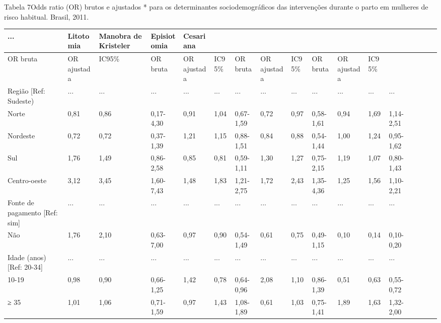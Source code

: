 \documentclass{article}
\begin{document}
Tabela 7Odds ratio (OR) brutos e ajustados * para os determinantes
sociodemográficos das intervenções durante o parto em mulheres de risco
habitual. Brasil, 2011.
\begin{table}
\begin{xtabular}{ l | l | l | l | l l | l | l | l | l | l | l | l | l | l | l |
l }
\hline... & Litotomia & Manobra de Kristeler & Episiotomia & Cesariana\\ \hline
OR bruta & OR ajustada & IC95\% & OR bruta & OR ajustada & IC95\% & OR bruta &
OR ajustada & IC95\% & OR bruta & OR ajustada & IC95\%\\ \hline
Região [Ref: Sudeste)
& ...
& ...
& ...
& ...
& ...
& ...
& ...
& ...
& ...
& ...
& ...
& ...
\\ \hline

Norte
& 0,81
& 0,86
& 0,17-4,30
& 0,91
& 1,04
& 0,67-1,59
& 0,72
& 0,97
& 0,58-1,61
& 0,94
& 1,69
& 1,14-2,51
\\ \hline

Nordeste
& 0,72
& 0,72
& 0,37-1,39
& 1,21
& 1,15
& 0,88-1,51
& 0,84
& 0,88
& 0,54-1,44
& 1,00
& 1,24
& 0,95-1,62
\\ \hline

Sul
& 1,76
& 1,49
& 0,86-2,58
& 0,85
& 0,81
& 0,59-1,11
& 1,30
& 1,27
& 0,75-2,15
& 1,19
& 1,07
& 0,80-1,43
\\ \hline

Centro-oeste
& 3,12
& 3,45
& 1,60-7,43
& 1,48
& 1,83
& 1,21-2,75
& 1,72
& 2,43
& 1,35-4,36
& 1,25
& 1,56
& 1,10-2,21
\\ \hline

Fonte de pagamento [Ref: sim]
& ...
& ...
& ...
& ...
& ...
& ...
& ...
& ...
& ...
& ...
& ...
& ...
\\ \hline

Não
& 1,76
& 2,10
& 0,63-7,00
& 0,97
& 0,90
& 0,54-1,49
& 0,61
& 0,75
& 0,49-1,15
& 0,10
& 0,14
& 0,10-0,20
\\ \hline

Idade (anos) [Ref: 20-34]
& ...
& ...
& ...
& ...
& ...
& ...
& ...
& ...
& ...
& ...
& ...
& ...
\\ \hline

10-19
& 0,98
& 0,90
& 0,66-1,25
& 1,42
& 0,78
& 0,64-0,96
& 2,08
& 1,10
& 0,86-1,39
& 0,51
& 0,63
& 0,55-0,72
\\ \hline

≥ 35
& 1,01
& 1,06
& 0,71-1,59
& 0,97
& 1,43
& 1,08-1,89
& 0,61
& 1,03
& 0,75-1,41
& 1,89
& 1,63
& 1,32-2,00
\\ \hline


\end{xtabular}
\end{table}
\end{document}
